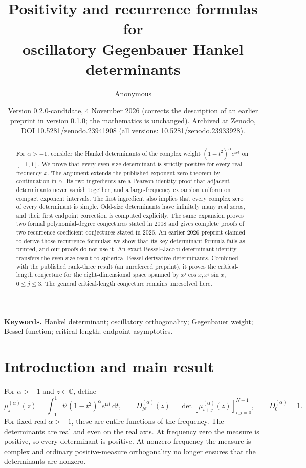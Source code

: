 \documentclass[11pt]{article}
\title{Positivity and recurrence formulas for\texorpdfstring{\\}{}oscillatory Gegenbauer Hankel determinants}
\author{Anonymous}
\date{Version 0.2.0-candidate, 4 November 2026 (corrects the description
of an earlier preprint in version 0.1.0; the mathematics is unchanged).
Archived at Zenodo,
DOI \href{https://doi.org/10.5281/zenodo.23941908}{10.5281/zenodo.23941908}
(all versions: \href{https://doi.org/10.5281/zenodo.23933928}{10.5281/zenodo.23933928}).}
\numberwithin{equation}{section}
\theoremstyle{remark}
\newcommand{\ii}{\mathrm{i}}
\newcommand{\dd}{\,\mathrm{d}}
\newcommand{\C}{\mathbb{C}}
\begin{document}
\maketitle

\begin{abstract}
For $\alpha>-1$, consider the Hankel determinants of the complex weight
$(1-t^2)^\alpha e^{\ii xt}$ on $[-1,1]$. We prove that every even-size
determinant is strictly positive for every real frequency $x$. The argument
extends the published exponent-zero theorem by continuation in $\alpha$.
Its two ingredients are a Pearson-identity proof that adjacent determinants
never vanish together, and a large-frequency expansion uniform on compact
exponent intervals. The first ingredient also implies that every complex
zero of every determinant is simple. Odd-size determinants have infinitely
many real zeros, and their first endpoint correction is computed explicitly.
The same expansion proves two formal polynomial-degree conjectures stated
in 2008 and gives complete proofs of two recurrence-coefficient conjectures
stated in 2026. An earlier 2026 preprint claimed to derive those
recurrence formulas; we show that its key determinant formula fails as
printed, and our proofs do not use it. An exact
Bessel--Jacobi determinant identity transfers the even-size result to
spherical-Bessel derivative determinants. Combined with the published
rank-three result (an unrefereed preprint), it proves the critical-length conjecture for the
eight-dimensional space spanned by $x^j\cos x,x^j\sin x$, $0\le j\le3$.
The general critical-length conjecture remains unresolved here.
\end{abstract}

\noindent\textbf{Keywords.} Hankel determinant; oscillatory orthogonality;
Gegenbauer weight; Bessel function; critical length; endpoint asymptotics.

\section{Introduction and main result}

For $\alpha>-1$ and $z\in\C$, define
\begin{equation}\label{eq:definitions}
 \mu_j^{(\alpha)}(z)=\int_{-1}^1t^j(1-t^2)^\alpha e^{\ii zt}\dd t,
 \qquad
 D_N^{(\alpha)}(z)=
 \det[\mu_{i+j}^{(\alpha)}(z)]_{i,j=0}^{N-1},\qquad D_0^{(\alpha)}=1.
\end{equation}
For fixed real $\alpha>-1$, these are entire functions of the frequency.
The determinants are real and even on the real axis. At frequency zero the measure is
positive, so every determinant is positive. At nonzero frequency the
measure is complex and ordinary positive-measure orthogonality no longer
ensures that the determinants are nonzero.
\end{document}
